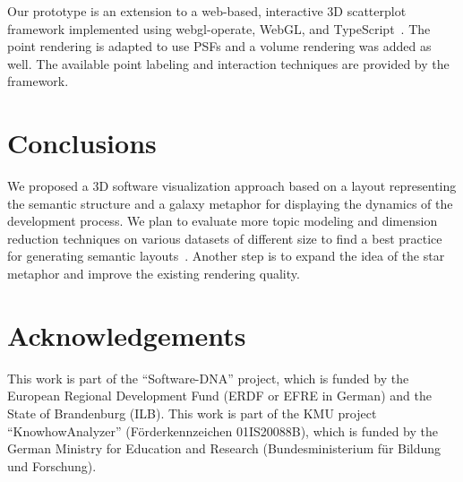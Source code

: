 \documentclass[sigconf%
,natbib=true%
]{acmart}
\begin{document}
Our prototype is an extension to a web-based, interactive 3D scatterplot framework implemented using webgl-operate, WebGL, and TypeScript~\cite{wagner2020-scatterplot}. %
The point rendering is adapted to use PSFs and a volume rendering was added as well.
The available point labeling and interaction techniques are provided by the framework.

\section{Conclusions}
We proposed a 3D software visualization approach based on a layout representing the semantic structure and a galaxy metaphor for displaying the dynamics of the development process.
We plan to evaluate more topic modeling and dimension reduction techniques on various datasets of different size to find a best practice for generating semantic layouts~\cite{vernier2021-guided}.
Another step is to expand the idea of the star metaphor and improve the existing rendering quality.

\section*{Acknowledgements}
This work is part of the \enquote{Software-DNA} project, which is funded by the European Regional Development Fund (ERDF or EFRE in German) and the State of Brandenburg (ILB).
This work is part of the KMU project \enquote{KnowhowAnalyzer} (Förderkennzeichen 01IS20088B), which is funded by the German Ministry for Education and Research (Bundesministerium für Bildung und Forschung).

    \label{fig:basic-trans-vars}

\nocite{knoeschke2020-thesis}



\end{document}
